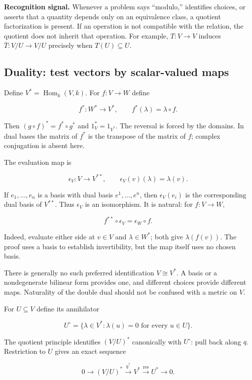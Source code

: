 \documentclass[
  11pt,
]{article}
\begin{document}
\textbf{Recognition signal.} Whenever a problem says ``modulo,''
identifies choices, or asserts that a quantity depends only on an
equivalence class, a quotient factorization is present. If an operation
is not compatible with the relation, the quotient does not inherit that
operation. For example, \(T:V\to V\) induces \(\bar T:V/U\to V/U\)
precisely when \(T(U)\subseteq U\).

\subsection{Duality: test vectors by scalar-valued
maps}\label{duality-test-vectors-by-scalar-valued-maps}

Define \(V^*=\operatorname{Hom}_k(V,k)\). For \(f:V\to W\) define

\[f^*:W^*\to V^*,\qquad f^*(\lambda)=\lambda\circ f.\]

Then \((g\circ f)^*=f^*\circ g^*\) and \(1_V^*=1_{V^*}\). The reversal
is forced by the domains. In dual bases the matrix of \(f^*\) is the
transpose of the matrix of \(f\); complex conjugation is absent here.

The evaluation map is

\[\epsilon_V:V\to V^{**},\qquad
\epsilon_V(v)(\lambda)=\lambda(v).\]

If \(e_1,\ldots,e_n\) is a basis with dual basis \(e^1,\ldots,e^n\),
then \(\epsilon_V(e_i)\) is the corresponding dual basis of \(V^{**}\).
Thus \(\epsilon_V\) is an isomorphism. It is natural: for \(f:V\to W\),

\[f^{**}\circ\epsilon_V=\epsilon_W\circ f.\]

Indeed, evaluate either side at \(v\in V\) and \(\lambda\in W^*\); both
give \(\lambda(f(v))\). The proof uses a basis to establish
invertibility, but the map itself uses no chosen basis.

There is generally no such preferred identification \(V\cong V^*\). A
basis or a nondegenerate bilinear form provides one, and different
choices provide different maps. Naturality of the double dual should not
be confused with a metric on \(V\).

For \(U\subseteq V\) define its annihilator

\[U^\circ=\{\lambda\in V^*: \lambda(u)=0\text{ for every }u\in U\}.\]

The quotient principle identifies \((V/U)^*\) canonically with
\(U^\circ\): pull back along \(q\). Restriction to \(U\) gives an exact
sequence

\[0\longrightarrow(V/U)^*\xrightarrow{q^*}V^*
\xrightarrow{\mathrm{res}}U^*\longrightarrow0.\]
\end{document}

